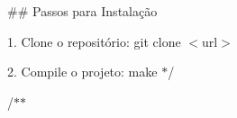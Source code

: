 
\begin{DoxyItemize}
\item 
\item \#\# Passos para Instalação
\item 1. Clone o repositório\+: {\ttfamily git clone $<$url$>$}
\item 2. Compile o projeto\+: {\ttfamily make} $\ast$/
\end{DoxyItemize}

/$\ast$$\ast$
\begin{DoxyItemize}
\item 
\end{DoxyItemize}